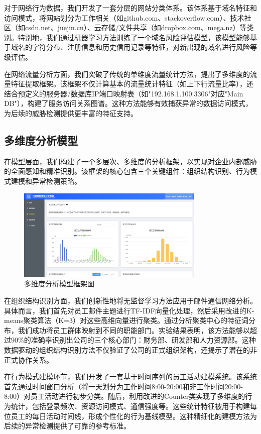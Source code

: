 \documentclass[UTF8,12pt]{ctexart}
\begin{document}
对于网络行为数据，我们开发了一套分层的网站分类体系。该体系基于域名特征和访问模式，将网站划分为工作相关（如github.com、stackoverflow.com）、技术社区（如csdn.net、juejin.cn）、云存储/文件共享（如dropbox.com、mega.nz）等类别。特别地，我们通过机器学习方法训练了一个域名风险评估模型，该模型能够基于域名的字符分布、注册信息和历史信用记录等特征，对新出现的域名进行风险等级评估。

在网络流量分析方面，我们突破了传统的单维度流量统计方法，提出了多维度的流量特征提取框架。该框架不仅计算基本的流量统计特征（如上下行流量比率），还结合预定义的服务器/数据库IP端口映射表（如"192.168.1.100:3306"对应"Main DB"），构建了服务访问关系图谱。这种方法能够有效捕获异常的数据访问模式，为后续的威胁检测提供更丰富的特征支持。

\subsection{多维度分析模型}
在模型层面，我们构建了一个多层次、多维度的分析框架，以实现对企业内部威胁的全面感知和精准识别。该框架的核心包含三个关键组件：组织结构识别、行为模式建模和异常检测策略。

\begin{figure}[H]
    \centering
    \includegraphics[width=0.8\textwidth]{analysis.png}
    \caption{多维度分析模型框架图}
    \label{fig:analysis_framework}
\end{figure}

在组织结构识别方面，我们创新性地将无监督学习方法应用于邮件通信网络分析。具体而言，我们首先对员工邮件主题进行TF-IDF向量化处理，然后采用改进的K-means聚类算法（K=3）对这些高维向量进行聚类。通过分析聚类中心的特征词分布，我们成功将员工群体映射到不同的职能部门。实验结果表明，该方法能够以超过90\%的准确率识别出公司的三个核心部门：财务部、研发部和人力资源部。这种数据驱动的组织结构识别方法不仅验证了公司的正式组织架构，还揭示了潜在的非正式协作关系。

在行为模式建模环节，我们开发了一套基于时间序列的员工活动建模系统。该系统首先通过时间窗口分析（将一天划分为工作时间8:00-20:00和非工作时间20:00-8:00）对员工活动进行初步分类。随后，利用改进的Counter类实现了多维度的行为统计，包括登录频次、资源访问模式、通信强度等。这些统计特征被用于构建每位员工的每日活动时间线，形成个性化的行为基线模型。这种精细化的建模方法为后续的异常检测提供了可靠的参考标准。
\end{document}
